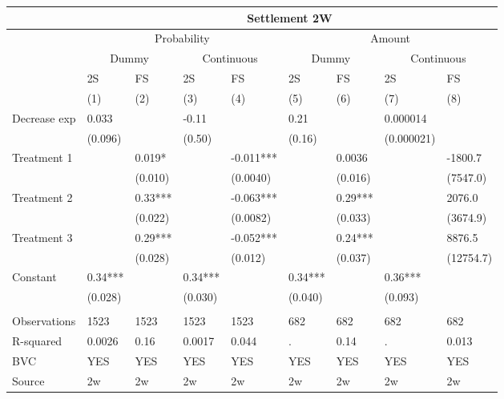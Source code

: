 \begin{tabular}{lllllllll}
      & \multicolumn{8}{c}{Settlement 2W} \\
\midrule
      & \multicolumn{4}{c}{Probability} & \multicolumn{4}{c}{Amount} \\
\midrule
\midrule
      & \multicolumn{2}{c}{Dummy} & \multicolumn{2}{c}{Continuous} & \multicolumn{2}{c}{Dummy} & \multicolumn{2}{c}{Continuous} \\
\midrule
      & 2S    & FS    & 2S    & FS    & 2S    & FS    & 2S    & FS \\
\midrule
\midrule
      & (1)   & (2)   & (3)   & (4)   & (5)   & (6)   & (7)   & (8) \\
\midrule
\midrule
Decrease exp & 0.033 &       & -0.11 &       & 0.21  &       & 0.000014 &  \\
      & (0.096) &       & (0.50) &       & (0.16) &       & (0.000021) &  \\
Treatment 1  &       & 0.019* &       & -0.011*** &       & 0.0036 &       & -1800.7 \\
      &       & (0.010) &       & (0.0040) &       & (0.016) &       & (7547.0) \\
Treatment 2 &       & 0.33*** &       & -0.063*** &       & 0.29*** &       & 2076.0 \\
      &       & (0.022) &       & (0.0082) &       & (0.033) &       & (3674.9) \\
Treatment 3 &       & 0.29*** &       & -0.052*** &       & 0.24*** &       & 8876.5 \\
      &       & (0.028) &       & (0.012) &       & (0.037) &       & (12754.7) \\
Constant & 0.34*** &       & 0.34*** &       & 0.34*** &       & 0.36*** &  \\
      & (0.028) &       & (0.030) &       & (0.040) &       & (0.093) &  \\
      &       &       &       &       &       &       &       &  \\
\midrule
Observations & 1523  & 1523  & 1523  & 1523  & 682   & 682   & 682   & 682 \\
R-squared & 0.0026 & 0.16  & 0.0017 & 0.044 & .     & 0.14  & .     & 0.013 \\
BVC   & YES   & YES   & YES   & YES   & YES   & YES   & YES   & YES \\
Source & 2w    & 2w    & 2w    & 2w    & 2w    & 2w    & 2w    & 2w \\
\bottomrule
\bottomrule
\end{tabular}%
